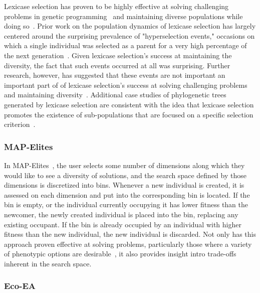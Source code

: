 Lexicase selection has proven to be highly effective at solving challenging problems in genetic programming~\cite{helmuth_general_2015,helmuth_solving_2015} and maintaining diverse populations while doing so~\cite{helmuth_effects_2016}. Prior work on the population dynamics of lexicase selection has largely centered around the surprising prevalence of "hyperselection events," occasions on which a single individual was selected as a parent for a very high percentage of the next generation~\cite{mcphee_using_2016}. Given lexicase selection's success at maintaining the diversity, the fact that such events occurred at all was surprising. Further research, however, has suggested that these events are not important an important part of of lexicase selection's success at solving challenging problems and maintaining diversity~\cite{helmuth_impact_2016}. Additional case studies of phylogenetic trees generated by lexicase selection are consistent with the idea that lexicase selection promotes the existence of sub-populations that are focused on a specific selection criterion~\cite{mcphee_visualizing_2016}.

\subsubsection{MAP-Elites}

In MAP-Elites~\cite{mouret_illuminating_2015}, the user selects some number of dimensions along which they would like to see a diversity of solutions, and the search space defined by those dimensions is discretized into bins. Whenever a new individual is created, it is assessed on each dimension and put into the corresponding bin is located. If the bin is empty, or the individual currently occupying it has lower fitness than the newcomer, the newly created individual is placed into the bin, replacing any existing occupant. If the bin is already occupied by an individual with higher fitness than the new individual, the new individual is discarded. Not only has this approach proven effective at solving problems, particularly those where a variety of phenotypic options are desirable~\cite{cully_robots_2015}, it also provides insight intro trade-offs inherent in the search space.

\subsubsection{Eco-EA}

